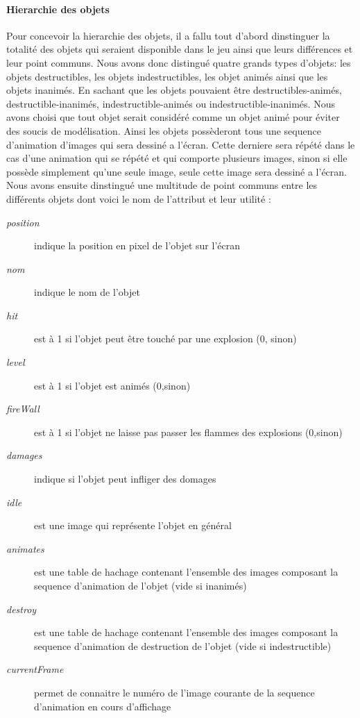 	\paragraph{Hierarchie des objets \\}
	
	Pour concevoir la hierarchie des objets, il a fallu tout d'abord dinstinguer la totalité des objets qui seraient disponible dans le jeu ainsi que leurs différences et leur point communs.  Nous avons donc distingué quatre grands types d'objets: les objets destructibles, les objets indestructibles, les objet animés ainsi que les objets inanimés. En sachant que les objets pouvaient être destructibles-animés, destructible-inanimés, indestructible-animés ou indestructible-inanimés. Nous avons choisi que tout objet serait considéré comme un objet animé pour éviter des soucis de modélisation. Ainsi les objets possèderont tous une sequence d'animation d'images qui sera dessiné a l'écran. Cette derniere sera répété dans le cas d'une animation qui se répété et qui comporte plusieurs images, sinon si elle possède simplement qu'une seule image, seule cette image sera dessiné a l'écran. Nous avons ensuite dinstingué une multitude de point communs entre les différents objets dont voici le nom de l'attribut et leur utilité : 
	
	\begin{description}
		\item [\textit{position}]{indique la position en pixel de l'objet sur l'écran}
		\item [\textit{nom}]{indique le nom de l'objet}
		\item [\textit{hit}]{est à 1 si l'objet peut être touché par une explosion (0, sinon)}
		\item [\textit{level}]{est à 1 si l'objet est animés (0,sinon)}
		\item [\textit{fireWall}]{est à 1 si l'objet ne laisse pas passer les flammes des explosions (0,sinon)}
		\item [\textit{damages}]{indique si l'objet peut infliger des domages}
		\item [\textit{idle}]{est une image qui représente l'objet en général}
		\item [\textit{animates}]{est une table de hachage contenant l'ensemble des images composant la sequence d'animation de l'objet (vide si inanimés)}
		\item [\textit{destroy}]{est une table de hachage contenant l'ensemble des images composant la sequence d'animation de destruction de l'objet (vide si indestructible)}
		\item [\textit{currentFrame}]{permet de connaitre le numéro de l'image courante de la sequence d'animation en cours d'affichage}
	\end{description}

